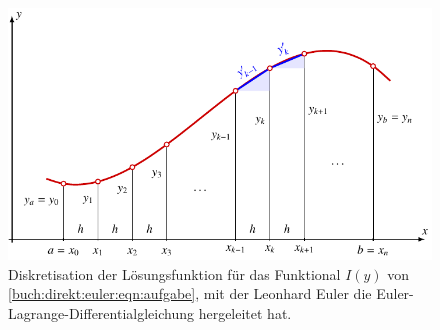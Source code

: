%
%
%
\begin{figure}
\centering
\includegraphics{chapters/070-direkt/images/euler.pdf}
\caption{Diskretisation der Lösungsfunktion für das Funktional
$I(y)$ von \eqref{buch:direkt:euler:eqn:aufgabe}, mit der Leonhard
Euler die Euler-Lagrange-Differentialgleichung hergeleitet hat.
\label{buch:direkt:euler:fig:euler}}
\end{figure}
